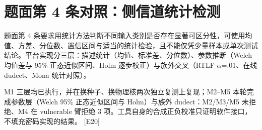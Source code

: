 \documentclass[UTF8,fontset=fandol,11pt,a4paper]{ctexart}
\begin{document}
\section{题面第 4 条对照：侧信道统计检测}
题面第 4 条要求用统计方法判断不同输入类别是否存在显著可区分性，可使用均值、方差、分位数、置信区间与适当的统计检验，且不能仅凭少量样本或单次测试结论。平台实现分三层：描述统计（均值、标准差、分位数）、参数推断（Welch 均值差与 95\% 正态近似区间、Holm 逐步校正）与族外交叉（RTLF \texorpdfstring{$\alpha$}{alpha}=.01、在线 dudect、Mona 统计对照）。


M1 三层均已执行，并在换种子、换物理核两次独立复测上复现；M2–M5 本轮完成参数层（Welch 95\% 正态近似区间与 Holm）与族外 dudect：M2/M3/M5 未拒绝、M4 在 vulnerable 臂拒绝 3 项。工具自身的合成正负校准只证明软件接口，不填充密码实现的结果。 [E20]
\end{document}
